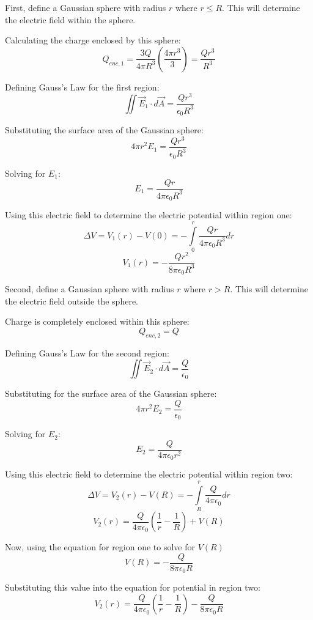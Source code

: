 \documentclass{article}
\begin{document}
\bigbreak

First, define a Gaussian sphere with radius $r$ where $r \leq R$. This will
determine the electric field within the sphere.

\bigbreak

Calculating the charge enclosed by this sphere:
$$ Q_{enc,1} = \frac{ 3 Q }{ 4 \pi R^{3} } \left( \frac{ 4 \pi r^{3} }{ 3 }
\right) = \frac{ Q r^{3} }{ R^{3} } $$

Defining Gauss's Law for the first region:
$$ \iint \vec{E}_{1} \cdot d\vec{A} = \frac{ Q r^{3} }{ \epsilon_{0} R^{3} } $$

Substituting the surface area of the Gaussian sphere:
$$ 4 \pi r^{2} E_{1} = \frac{ Q r^{3} }{ \epsilon_{0} R^{3} } $$

Solving for $E_{1}$:
$$ E_{1} = \frac{ Q r }{ 4 \pi \epsilon_{0} R^{3} } $$

Using this electric field to determine the electric potential within region one:
$$ \Delta V = V_{1}(r) - V(0) = - \int\limits_{0}^{r} \frac{ Q r }{ 4 \pi \epsilon_0
R^{3}} dr $$
$$V_{1}(r) = -\frac{ Q r^{2} }{ 8 \pi \epsilon_{0} R^{3} } $$

\bigbreak

Second, define a Gaussian sphere with radius $r$ where $r > R$. This will
determine the electric field outside the sphere.

\bigbreak

Charge is completely enclosed within this sphere:
$$ Q_{enc,2} = Q $$

Defining Gauss's Law for the second region:
$$ \iint \vec{E}_{2} \cdot d\vec{A} = \frac{ Q }{ \epsilon_{0} } $$

Substituting for the surface area of the Gaussian sphere:
$$ 4 \pi r^{2} E_{2} = \frac{ Q }{ \epsilon_{0} } $$

Solving for $E_{2}$:
$$ E_{2} = \frac{ Q }{ 4 \pi \epsilon_{0} r^{2} } $$

Using this electric field to determine the electric potential within region two:
$$ \Delta V = V_{2}(r) - V(R) = - \int\limits_{R}^{r} \frac{ Q }{ 4 \pi
\epsilon_{0} } dr$$
$$ V_{2}(r) = \frac{ Q }{ 4 \pi \epsilon_0 } \left( \frac{ 1 }{ r } - \frac{ 1
}{ R } \right) + V(R) $$

Now, using the equation for region one to solve for $V(R)$
$$ V(R) = -\frac{ Q }{ 8 \pi \epsilon_0 R } $$

Substituting this value into the equation for potential in region two:
$$ V_{2}(r) = \frac{ Q }{ 4 \pi \epsilon_0 } \left( \frac{ 1 }{ r } - \frac{ 1
}{ R } \right) -\frac{ Q }{ 8 \pi \epsilon_0 R } $$
\end{document}
